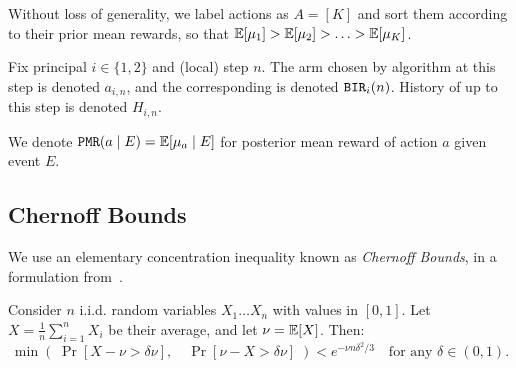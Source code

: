  Without loss of generality, we label actions as $A=[K]$ and sort them according to their prior mean rewards, so that
    $ \E[\mu_1] > \E[\mu_2] > \ldots > \E[\mu_K]$.

Fix principal $i\in \{1,2\}$ and (local) step $n$. The arm chosen by algorithm \alg[i] at this step is denoted $a_{i,n}$, and the corresponding \BIR is denoted $\mathtt{BIR}_i(n)$. History of \alg[i] up to this step is denoted $H_{i,n}$.

We denote
    $\PMR(a\mid E) = \E[\mu_a \mid E]$
for posterior mean reward of action $a$ given event $E$.


\subsection{Chernoff Bounds}

We use an elementary concentration inequality known as {\em Chernoff Bounds}, in a formulation from~\cite{MitzUpfal-book05}.
\begin{theorem}
\label{thm:chernoff}
Consider $n$ i.i.d. random variables $X_1 \ldots X_n$ with values in $[0,1]$. Let
    $X = \tfrac{1}{n} \sum_{i=1}^n X_i$ be their average, and let $\nu = \E[X]$. Then:
\[ \min\left(\; \Pr[ X-\nu > \delta \nu ],\quad
                \Pr[ \nu-X > \delta \nu ]
    \; \right)
    < e^{-\nu n \delta^2/3}
    \quad \text{for any $\delta\in (0,1)$.}
\]
\end{theorem}




